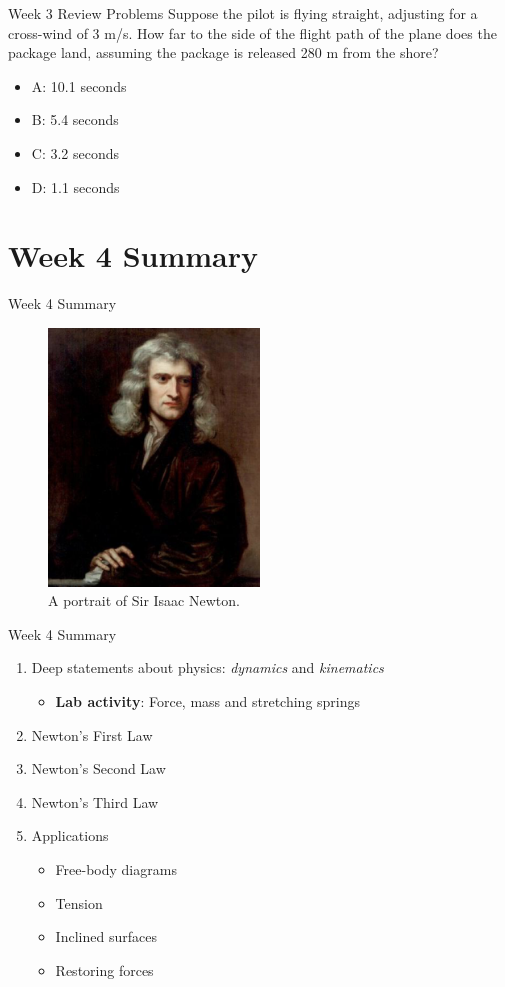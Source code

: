 \documentclass{beamer}
\begin{document}
\begin{frame}{Week 3 Review Problems}
\small
Suppose the pilot is flying straight, adjusting for a cross-wind of 3 m/s.  How far to the side of the flight path of the plane does the package land, assuming the package is released 280 m from the shore?
\begin{itemize}
\item A: 10.1 seconds
\item B: 5.4 seconds
\item C: 3.2 seconds
\item D: 1.1 seconds
\end{itemize}
\end{frame}

\section{Week 4 Summary}

\begin{frame}{Week 4 Summary}
\begin{figure}
\centering
\includegraphics[width=0.5\textwidth]{figures/newton.png}
\caption{\label{fig:newton} A portrait of Sir Isaac Newton.}
\end{figure}
\end{frame}

\begin{frame}{Week 4 Summary}
\begin{enumerate}
\item Deep statements about physics: \textit{dynamics} and \textit{kinematics}
\begin{itemize}
\item \textbf{Lab activity}: Force, mass and stretching springs
\end{itemize}
\item Newton's \alert{First Law}
\item Newton's \alert{Second Law}
\item Newton's \alert{Third Law}
\item Applications
\begin{itemize}
\item Free-body diagrams
\item Tension
\item Inclined surfaces
\item Restoring forces
\end{itemize}
\end{enumerate}
\end{frame}
\end{document}
